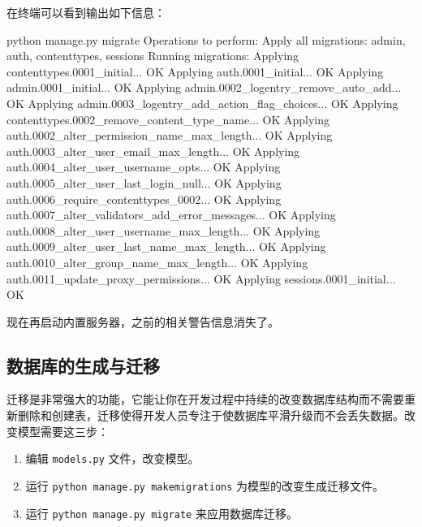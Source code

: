 \documentclass[]{ctexbook}
\newenvironment{Shaded}{\begin{snugshade}}{\end{snugshade}}
\newcommand{\ExtensionTok}[1]{#1}
\newcommand{\NormalTok}[1]{#1}
\providecommand{\tightlist}{%
  \setlength{\itemsep}{0pt}\setlength{\parskip}{0pt}}
\begin{document}
在终端可以看到输出如下信息：

\begin{Shaded}
\begin{Highlighting}[]
\ExtensionTok{python}\NormalTok{ manage.py migrate}
\ExtensionTok{Operations}\NormalTok{ to perform:}
  \ExtensionTok{Apply}\NormalTok{ all migrations: admin, auth, contenttypes, sessions}
\ExtensionTok{Running}\NormalTok{ migrations:}
  \ExtensionTok{Applying}\NormalTok{ contenttypes.0001_initial... OK}
  \ExtensionTok{Applying}\NormalTok{ auth.0001_initial... OK}
  \ExtensionTok{Applying}\NormalTok{ admin.0001_initial... OK}
  \ExtensionTok{Applying}\NormalTok{ admin.0002_logentry_remove_auto_add... OK}
  \ExtensionTok{Applying}\NormalTok{ admin.0003_logentry_add_action_flag_choices... OK}
  \ExtensionTok{Applying}\NormalTok{ contenttypes.0002_remove_content_type_name... OK}
  \ExtensionTok{Applying}\NormalTok{ auth.0002_alter_permission_name_max_length... OK}
  \ExtensionTok{Applying}\NormalTok{ auth.0003_alter_user_email_max_length... OK}
  \ExtensionTok{Applying}\NormalTok{ auth.0004_alter_user_username_opts... OK}
  \ExtensionTok{Applying}\NormalTok{ auth.0005_alter_user_last_login_null... OK}
  \ExtensionTok{Applying}\NormalTok{ auth.0006_require_contenttypes_0002... OK}
  \ExtensionTok{Applying}\NormalTok{ auth.0007_alter_validators_add_error_messages... OK}
  \ExtensionTok{Applying}\NormalTok{ auth.0008_alter_user_username_max_length... OK}
  \ExtensionTok{Applying}\NormalTok{ auth.0009_alter_user_last_name_max_length... OK}
  \ExtensionTok{Applying}\NormalTok{ auth.0010_alter_group_name_max_length... OK}
  \ExtensionTok{Applying}\NormalTok{ auth.0011_update_proxy_permissions... OK}
  \ExtensionTok{Applying}\NormalTok{ sessions.0001_initial... OK}
\end{Highlighting}
\end{Shaded}

现在再启动内置服务器，之前的相关警告信息消失了。

\hypertarget{ux6570ux636eux5e93ux7684ux751fux6210ux4e0eux8fc1ux79fb}{%
\subsection{数据库的生成与迁移}\label{ux6570ux636eux5e93ux7684ux751fux6210ux4e0eux8fc1ux79fb}}

迁移是非常强大的功能，它能让你在开发过程中持续的改变数据库结构而不需要重新删除和创建表，迁移使得开发人员专注于使数据库平滑升级而不会丢失数据。改变模型需要这三步：

\begin{enumerate}
\def\labelenumi{\arabic{enumi}.}
\tightlist
\item
  编辑 \texttt{models.py} 文件，改变模型。
\item
  运行 \texttt{python\ manage.py\ makemigrations} 为模型的改变生成迁移文件。
\item
  运行 \texttt{python\ manage.py\ migrate} 来应用数据库迁移。
\end{enumerate}
\end{document}
